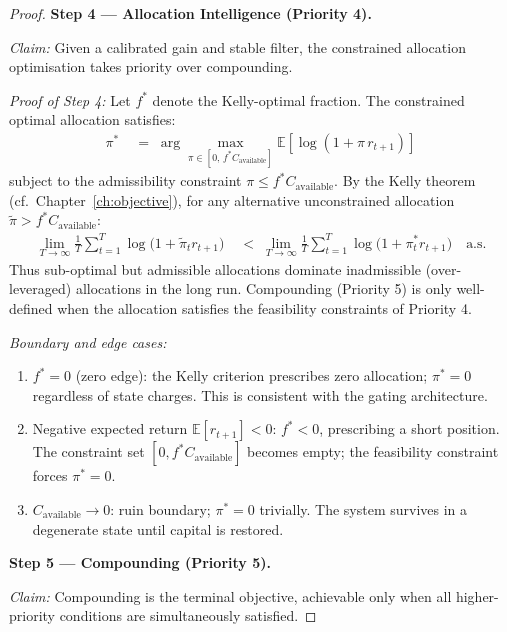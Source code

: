 \documentclass[12pt,openany]{book}
\numberwithin{equation}{chapter}
\theoremstyle{plain}
\theoremstyle{definition}
\theoremstyle{remark}
\begin{document}
\begin{proof}
\medskip
\noindent\textbf{Step 4 — Allocation Intelligence (Priority 4).}

\noindent\textit{Claim:} Given a calibrated gain and stable
filter, the constrained allocation optimisation takes priority
over compounding.

\noindent\textit{Proof of Step 4:}
Let $f^*$ denote the Kelly-optimal fraction.  The constrained
optimal allocation satisfies:
\begin{align}
  \pi^*
  &\;=\; \arg\max_{\pi \in [0,\,f^* C_{\mathrm{available}}]}
        \mathbb{E}[\log(1 + \pi\, r_{t+1})]
  \label{eq:pf-kelly-opt}
\end{align}
subject to the admissibility constraint
$\pi \leq f^* C_{\mathrm{available}}$.  By the Kelly theorem
(cf.\ Chapter~\ref{ch:objective}), for any alternative
unconstrained allocation $\tilde{\pi} > f^* C_{\mathrm{available}}$:
\begin{align}
  \lim_{T\to\infty}\frac{1}{T}\sum_{t=1}^T
  \log\!\bigl(1 + \tilde{\pi}_t r_{t+1}\bigr)
  &\;<\; \lim_{T\to\infty}\frac{1}{T}\sum_{t=1}^T
        \log\!\bigl(1 + \pi^*_t r_{t+1}\bigr)
  \quad \text{a.s.}
  \label{eq:pf-kelly-dominance}
\end{align}
Thus sub-optimal but admissible allocations dominate
inadmissible (over-leveraged) allocations in the long run.
Compounding (Priority 5) is only well-defined when the
allocation satisfies the feasibility constraints of Priority 4.

\noindent\textit{Boundary and edge cases:}
\begin{enumerate}
  \item $f^* = 0$ (zero edge): the Kelly criterion prescribes
        zero allocation; $\pi^* = 0$ regardless of state charges.
        This is consistent with the gating architecture.
  \item Negative expected return $\mathbb{E}[r_{t+1}] < 0$:
        $f^* < 0$, prescribing a short position.  The constraint
        set $[0, f^* C_{\mathrm{available}}]$ becomes empty;
        the feasibility constraint forces $\pi^* = 0$.
  \item $C_{\mathrm{available}} \to 0$: ruin boundary; $\pi^* = 0$
        trivially.  The system survives in a degenerate state
        until capital is restored.
\end{enumerate}

\medskip
\noindent\textbf{Step 5 — Compounding (Priority 5).}

\noindent\textit{Claim:} Compounding is the terminal objective,
achievable only when all higher-priority conditions are
simultaneously satisfied.


\end{proof}
\end{document}
